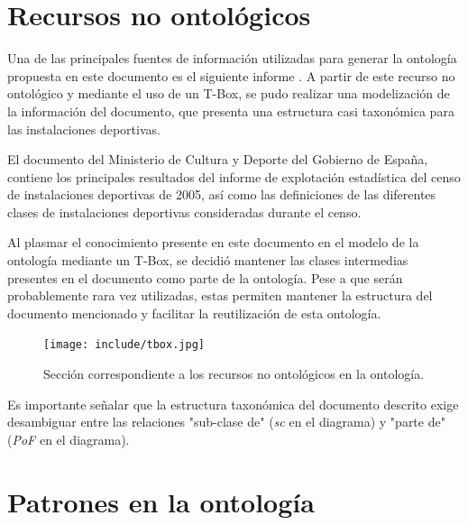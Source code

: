 \documentclass[a4paper,12pt]{article}
\begin{document}
	\section{Recursos no ontológicos}
	
	Una de las principales fuentes de información utilizadas para generar la ontología propuesta en este documento es el siguiente informe \cite{pdf-culturaydeporte}. A partir de este recurso no ontológico y mediante el uso de un T-Box, se pudo realizar una modelización de la información del documento, que presenta una estructura casi taxonómica para las instalaciones deportivas. 
	
	El documento \cite{pdf-culturaydeporte} del Ministerio de Cultura y Deporte del Gobierno de España, contiene los  principales resultados del informe de explotación estadística del censo de instalaciones deportivas de 2005, así como las definiciones de las diferentes clases de instalaciones deportivas consideradas durante el censo.
	
	Al plasmar el conocimiento presente en este documento en el modelo de la ontología mediante un T-Box, se decidió mantener las clases intermedias presentes en el documento como parte de la ontología. Pese a que serán probablemente rara vez utilizadas, estas permiten mantener la estructura del documento mencionado y facilitar la reutilización de esta ontología. 
	
	\begin{figure}[H]
		\centering
		\texttt{[image: include/tbox.jpg]}
		\caption{Sección correspondiente a los recursos no ontológicos en la ontología.}
	\end{figure}
	
	Es importante señalar que la estructura taxonómica del documento descrito exige desambiguar entre las relaciones "sub-clase de" (\textit{sc} en el diagrama) y "parte de" (\textit{PoF} en el diagrama).
	
	\section{Patrones en la ontología}
	
\end{document}
